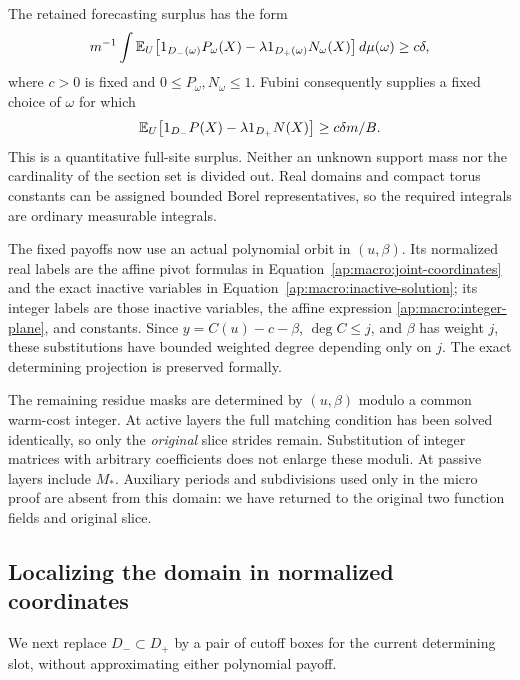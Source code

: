 The retained forecasting surplus has the form
\begin{equation}\label{ap:macro:freeze-integral}
 m^{-1}\int \mathbb E_U
       \bigl[1_{D_-(\omega)}P_\omega(X)
                 -\lambda 1_{D_+(\omega)}N_\omega(X)\bigr]
                                                  \,d\mu(\omega)
                  \ge c\delta,
\end{equation}
where $c>0$ is fixed and $0\le P_\omega,N_\omega\le1$.
Fubini consequently supplies a fixed choice of $\omega$ for which
\begin{equation}\label{ap:macro:frozen-score}
 \mathbb E_U\bigl[1_{D_-}P(X)-\lambda1_{D_+}N(X)\bigr]
                   \ge c\delta m/B.
\end{equation}
This is a quantitative full-site surplus.  Neither an unknown support
mass nor the cardinality of the section set is divided out.  Real
domains and compact torus constants can be assigned bounded Borel
representatives, so the required integrals are ordinary measurable
integrals.

The fixed payoffs now use an actual polynomial orbit in $(u,\beta)$.
Its normalized real labels are the affine pivot formulas in
Equation~\eqref{ap:macro:joint-coordinates} and the exact inactive
variables in Equation~\eqref{ap:macro:inactive-solution}; its integer
labels are those inactive variables, the affine expression
\eqref{ap:macro:integer-plane}, and constants.  Since
$y=C(u)-c-\beta$, $\deg C\le j$, and $\beta$ has weight $j$, these
substitutions have bounded weighted degree depending only on $j$.
The exact determining projection is preserved formally.

The remaining residue masks are determined by $(u,\beta)$ modulo a
common warm-cost integer.  At active layers the full matching
condition has been solved identically, so only the \emph{original}
slice strides remain.  Substitution of integer matrices with arbitrary
coefficients does not enlarge these moduli.  At passive layers include
$M_*$.  Auxiliary periods and subdivisions used only in the micro
proof are absent from this domain: we have returned to the original
two function fields and original slice.

\subsection{Localizing the domain in normalized coordinates}

We next replace $D_-\subset D_+$ by a pair of cutoff boxes for the
current determining slot, without approximating either polynomial
payoff.

